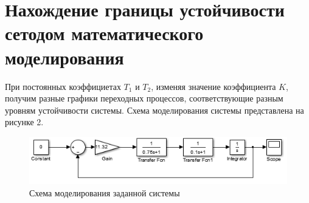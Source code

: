 \documentclass[a4paper, 11pt, russian]{article}
\begin{document}
    \section{Нахождение границы устойчивости сетодом математического моделирования}
    При постоянных коэффициетах $T_1$ и $T_2$, изменяя значение коэффициента $K$, получим разные графики переходных процессов, соответствующие разным уровням устойчивости системы. Схема моделирования системы представлена на рисунке 2.
    \begin{figure}[h!]
        \centering
        \includegraphics[scale = 1]{modelScheme.png}
        \caption{Схема моделирования заданной системы}
    \end{figure}
    
\end{document}
